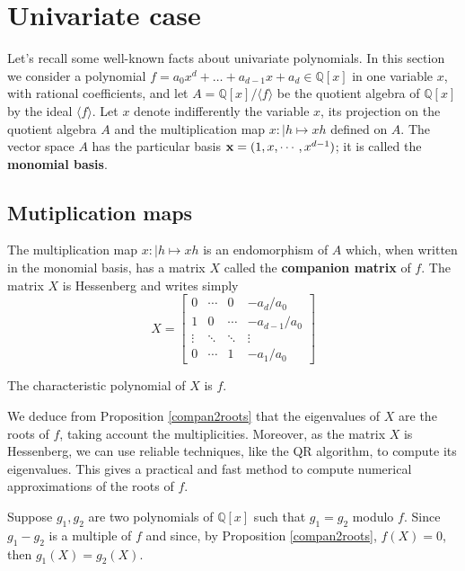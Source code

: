 \documentclass{standalone}
\begin{document}
\section{Univariate case}
\label{univariate}
Let's recall some well-known facts about univariate polynomials. In this section we consider a polynomial $f = a_0x^d + \dots + a_{d-1}x + a_d \in \mathbb{Q}[x]$ in one variable $x$, with rational coefficients, and let $A = \mathbb{Q}[x]/\langle f \rangle$ be the quotient algebra of $\mathbb{Q}[x]$ by the ideal $\langle f \rangle$.
Let $x$ denote indifferently the variable $x$, its projection on the quotient algebra $A$ and the multiplication map $x : \left\vert h \mapsto xh \right.$ defined on $A$. The vector space $A$ has the particular basis $\bold{x} = (1, x,\cdots, x^{d-1})$; it is called the {\bf monomial basis}.

\subsection{Mutiplication maps}
The multiplication map $x : \left\vert h \mapsto xh \right.$ is an endomorphism of $A$ which, when written in the monomial basis, has a matrix $X$ called the {\bf companion matrix} of $f$. The matrix $X$ is Hessenberg and writes simply
\begin{equation}
\label{compan}
X =
\begin{bmatrix}
	0 & \cdots & 0 & -a_d/a_0 \\
	1 & 0 & \cdots & -a_{d-1}/a_0 \\
	\vdots  & \ddots  & \ddots & \vdots  \\
	0 & \cdots & 1 & -a_1/a_0
\end{bmatrix}
\end{equation}
\begin{prop}
\label{compan2roots}
The characteristic polynomial of $X$ is $f$.
\end{prop}

\begin{rem}
We deduce from Proposition \ref{compan2roots} that the eigenvalues of $X$ are the roots of $f$, taking account the multiplicities. Moreover, as the matrix $X$ is Hessenberg, we can use reliable techniques, like the QR algorithm, to compute its eigenvalues. This gives a practical and fast method to compute numerical approximations of the roots of $f$. 
\end{rem}

\begin{rem}
\label{g_1=g_2}
Suppose $g_1, g_2$ are two polynomials of $\mathbb{Q}[x]$ such that $g_1 = g_2$ modulo $f$. Since $g_1-g_2$ is a multiple of $f$ and since, by Proposition \ref{compan2roots}, $f(X) = 0$, then $g_1(X) = g_2(X)$.
\end{rem}
\end{document}
